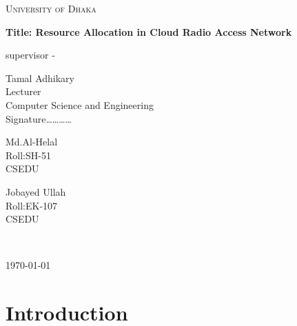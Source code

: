 \documentclass{article}
\begin{document}

\begin{titlepage}
\centering
{\scshape\LARGE University of Dhaka \par}
\vspace{1.5cm}
{\huge\bfseries Title: Resource Allocation in Cloud Radio Access Network\par}
\vspace{2cm}
supervisor -\par
Tamal Adhikary\\
Lecturer\\
Computer Science and Engineering\\
Signature\ldots\ldots\ldots\ldots\\
\vspace{3cm}
  \parbox{3cm}{
\centering Md.Al-Helal\\Roll:SH-51\\CSEDU}\hspace{4cm}
\parbox{3cm}{
{\centering Jobayed Ullah\\Roll:EK-107\\CSEDU}}\\
%
\vfill
{\large \today\par}
\end{titlepage}

\section{Introduction}
\end{document}
